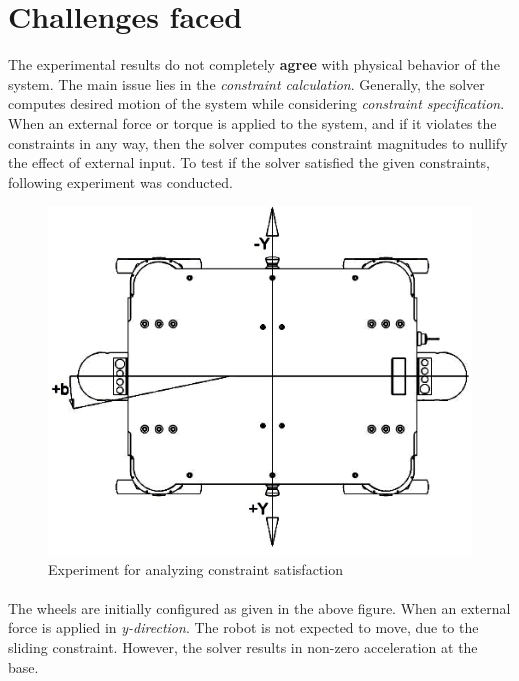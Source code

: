 \newpage

\section{Challenges faced}
The experimental results do not completely \textbf{agree} with physical behavior of the system. The main issue lies in the \textit{constraint calculation}. Generally, the solver computes desired motion of the system while considering \textit{constraint specification}. When an external force or torque is applied to the system, and if it violates the constraints in any way, then the solver computes constraint magnitudes to nullify the effect of external input. To test if the solver satisfied the given constraints, following experiment was conducted.

\begin{figure}[h!]
	\begin{center}
		\includegraphics[scale=0.4]{images/top-view.png}
	\end{center}
	\caption{Experiment for analyzing constraint satisfaction}
	\label{fig:top-view}
\end{figure}

\paragraph{}The wheels are initially configured as given in the above figure. When an external force is applied in \textit{y-direction}. The robot is not expected to move, due to the sliding constraint. However, the solver results in non-zero acceleration at the base. 

